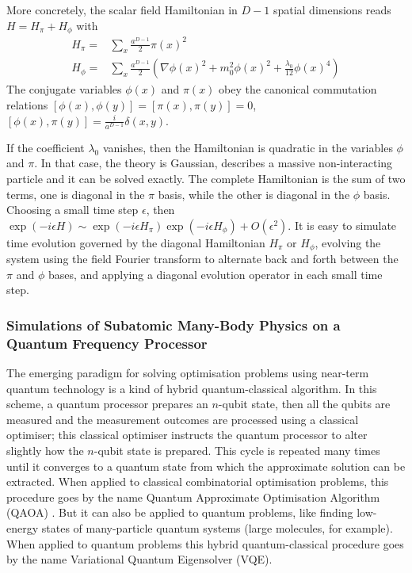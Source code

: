 \documentclass[epj,final]{svjour}
\begin{document}
More concretely, the scalar field Hamiltonian in $D-1$ spatial dimensions reads $H= H_{\pi} + H_{\phi}$ with
\begin{equation}
\begin{split}
H_{\pi} =& \sum_{x} \frac{a^{D-1}}{2}  \pi \left( x \right)^{2} \\
H_{\phi} =& \sum_{x} \frac{a^{D-1}}{2} \left( \nabla \phi \left( x \right)^{2} + m_{0}^{2} \phi \left( x \right)^{2} + \frac{\lambda_{0}}{12} \phi \left( x \right)^{4} \right)
\end{split}
\end{equation}
The conjugate variables $\phi (x)$ and $\pi (x)$ obey the canonical commutation relations $\left[ \phi \left( x \right) , \phi \left( y \right) \right] = \left[ \pi \left( x \right) , \pi \left( y \right) \right]  = 0$, $\left[ \phi \left( x \right) , \pi \left( y \right) \right] = \frac{i}{a^{D-1}} \delta \left(x ,y\right)$.

If the coefficient $\lambda_{0}$ vanishes, then the Hamiltonian is quadratic in the variables $\phi$ and $\pi$. In that case, the theory is Gaussian, describes a massive non-interacting particle and it can be solved exactly. The complete Hamiltonian is the sum of two terms, one is diagonal in the $\pi$ basis, while the other is diagonal in the $\phi$ basis. Choosing a small time step $\epsilon$, then $\exp{ \left( -i \epsilon H \right)} \sim \exp{ \left( -i \epsilon H_{\pi} \right)} \exp{ \left( -i \epsilon H_{\phi} \right)} + O \left( \epsilon^{2} \right)$. It is easy to simulate time evolution governed by the diagonal Hamiltonian $H_{\pi}$ or $H_{\phi}$, evolving the system using the field Fourier transform to alternate back and forth between the $\pi$ and $\phi$ bases, and applying a diagonal evolution operator in each small time step. 

\subsubsection{Simulations of Subatomic Many-Body Physics on a Quantum Frequency Processor\cite{lu2018simulations}}

The emerging paradigm for solving optimisation problems using near-term quantum technology is a kind of hybrid quantum-classical algorithm.  In this scheme, a quantum processor prepares an $n$-qubit state, then all the qubits are measured and the measurement outcomes are processed using a classical optimiser; this classical optimiser instructs the quantum processor to alter slightly how the $n$-qubit state is prepared. This cycle is repeated many times until it converges to a quantum state from which the approximate solution can be extracted. When applied to classical combinatorial optimisation problems, this procedure goes by the name Quantum Approximate Optimisation Algorithm (QAOA) \cite{farhi2014quantum}. But it can also be applied to quantum problems, like finding low-energy states of many-particle quantum systems (large molecules, for example). When applied to quantum problems this hybrid quantum-classical procedure goes by the name Variational Quantum Eigensolver (VQE).
\end{document}
